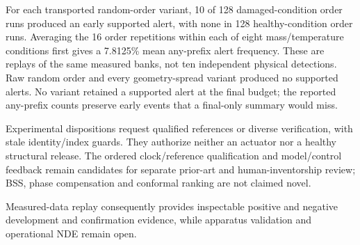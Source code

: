 For each transported random-order variant, 10 of 128 damaged-condition order
runs produced an early supported alert, with none in 128 healthy-condition
order runs. Averaging the 16 order repetitions within each of eight mass/temperature
conditions first gives a 7.8125\% mean any-prefix alert frequency. These are
replays of the same measured banks, not ten independent physical detections.
Raw random order and every geometry-spread variant produced no supported alerts.
No variant retained a supported alert at the final budget; the reported
any-prefix counts preserve early events that a final-only summary would miss.

Experimental dispositions request qualified references or diverse verification, with stale
identity/index guards. They authorize neither an actuator nor a healthy
structural release. The ordered clock/reference qualification and model/control
feedback remain candidates for separate prior-art and human-inventorship
review; BSS, phase compensation and conformal ranking are not claimed novel.

Measured-data replay consequently provides inspectable positive and negative
development and confirmation evidence, while apparatus validation and operational NDE remain open.

